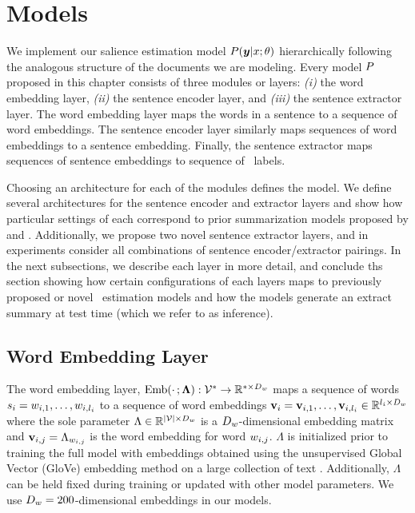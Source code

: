 \section{Models}

We implement our salience estimation model $P(\boldsymbol{y}|x;\theta)$ 
hierarchically following the analogous structure of the documents we are 
modeling.  Every model $P$ proposed in this chapter consists of three modules
or layers: \textit{(i)} the word embedding layer, \textit{(ii)} the sentence
encoder layer, and \textit{(iii)} the sentence extractor layer. 
The word embedding layer maps the words in a sentence to a sequence of 
word embeddings. The sentence encoder layer similarly maps sequences of 
word embeddings to a sentence embedding. Finally, the sentence extractor 
maps sequences of sentence embeddings to sequence of \salience~labels.

Choosing
an architecture for each of the modules defines the model. We define several
architectures for the sentence encoder and extractor layers and show how
particular settings of each correspond to prior summarization models proposed 
by \citet{cheng2016neural} and \citet{nallapati2017summarunner}. 
Additionally, we propose two novel sentence extractor layers, 
and in experiments 
consider all combinations of sentence encoder/extractor pairings.
In the next subsections, we 
describe each layer in more detail, and conclude ths section showing
how certain configurations of each layers maps to previously proposed or
novel \salience~estimation models and how the models generate an extract 
summary at test time (which we refer to as inference).

\subsection{Word Embedding Layer}

    The word embedding layer, $\operatorname{Emb}(\cdot\,;\boldsymbol{\Lambda}) : \mathcal{V}^* \rightarrow \mathbb{R}^{* \times D_{w}}$ maps a sequence of words $s_i = w_{i,1},\ldots,
w_{i,l_i}$ to a sequence of word embeddings $\mathbf{v}_i = \mathbf{v}_{i,1},
\ldots, \mathbf{v}_{i,l_i} \in \mathbb{R}^{l_i \times D_{w}}$
where the sole parameter $\Lambda \in \mathbb{R}^{|\mathcal{V}| \times D_{w}}$ 
is a $D_{w}$-dimensional embedding matrix and $\mathbf{v}_{i,j} = \Lambda_{w_{i,j}}$ is the word embedding for word $w_{i,j}$.
$\Lambda$ is initialized prior to training the full model with 
embeddings obtained using the unsupervised Global Vector (GloVe) embedding 
method on a large collection of text \citep{pennington2014glove}. 
Additionally, $\Lambda$ can be held fixed during training or updated 
with other model parameters. We use $D_{w} = 200$-dimensional embeddings
in our models.







